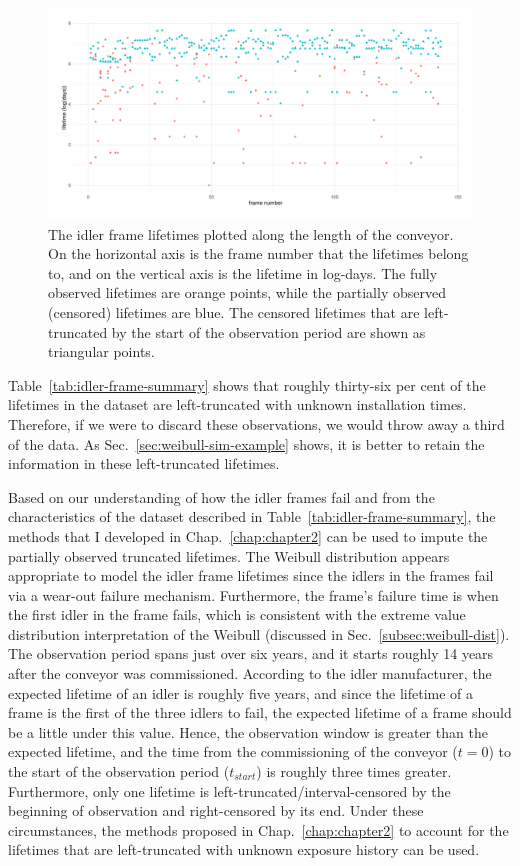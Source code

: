 \begin{figure}
  \centering
  \includegraphics[width=1\textwidth]{./figures/ch-3/idler-frame-data.pdf}
  \caption{The idler frame lifetimes plotted along the length of the conveyor. On the horizontal axis is the frame number that the lifetimes belong to, and on the vertical axis is the lifetime in log-days. The fully observed lifetimes are orange points, while the partially observed (censored) lifetimes are blue. The censored lifetimes that are left-truncated by the start of the observation period are shown as triangular points.}
  \label{fig:idler-frames-data}
\end{figure}

Table~\ref{tab:idler-frame-summary} shows that roughly thirty-six per cent of the lifetimes in the dataset are left-truncated with unknown installation times. Therefore, if we were to discard these observations, we would throw away a third of the data. As Sec.~\ref{sec:weibull-sim-example} shows, it is better to retain the information in these left-truncated lifetimes.

Based on our understanding of how the idler frames fail and from the characteristics of the dataset described in Table~\ref{tab:idler-frame-summary}, the methods that I developed in Chap.~\ref{chap:chapter2} can be used to impute the partially observed truncated lifetimes. The Weibull distribution appears appropriate to model the idler frame lifetimes since the idlers in the frames fail via a wear-out failure mechanism. Furthermore, the frame's failure time is when the first idler in the frame fails, which is consistent with the extreme value distribution interpretation of the Weibull (discussed in Sec.~\ref{subsec:weibull-dist}). The observation period spans just over six years, and it starts roughly 14 years after the conveyor was commissioned. According to the idler manufacturer, the expected lifetime of an idler is roughly five years, and since the lifetime of a frame is the first of the three idlers to fail, the expected lifetime of a frame should be a little under this value. Hence, the observation window is greater than the expected lifetime, and the time from the commissioning of the conveyor ($t = 0$) to the start of the observation period ($t_{start}$) is roughly three times greater. Furthermore, only one lifetime is left-truncated/interval-censored by the beginning of observation and right-censored by its end. Under these circumstances, the methods proposed in Chap.~\ref{chap:chapter2} to account for the lifetimes that are left-truncated with unknown exposure history can be used.

